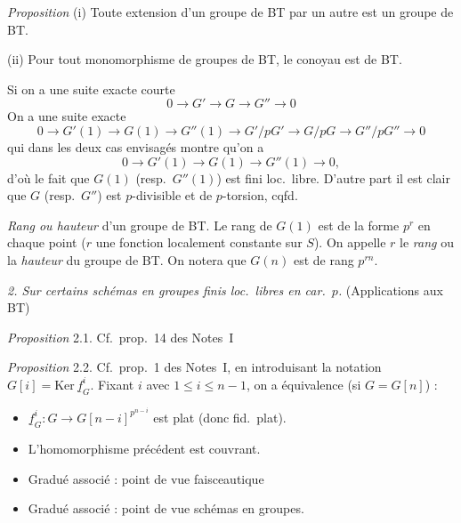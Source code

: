 \documentclass[11pt,a4paper]{article}
\begin{document}
\emph{Proposition} (i) Toute extension d'un groupe de BT par un autre est un groupe de BT.

(ii) Pour tout monomorphisme de groupes de BT, le conoyau est de BT.

 Si on a une suite exacte courte
\[
0 \to G' \to G \to G'' \to 0
\]
 On a une suite exacte
\[
0 \to G'(1) \to G(1) \to G''(1) \to G'/pG' \to G/pG \to G''/pG'' \to 0
\]
qui dans les deux cas envisagés montre qu'on a
\[
0 \to G'(1) \to G(1) \to G''(1) \to 0 ,
\]
d'où le fait que $G(1)$ (resp.\ $G''(1)$) est fini loc.\ libre. D'autre part il est clair que $G$ (resp.\ $G''$) est $p$-divisible et de $p$-torsion, cqfd.

\emph{Rang ou hauteur} d'un groupe de BT. Le rang de $G(1)$ est de la forme $p^r$ en chaque point ($r$ une fonction localement constante sur $S$). On appelle $r$ le \emph{rang} ou la \emph{hauteur} du groupe de BT. On notera que $G(n)$ est de rang $p^{rn}$.


\emph{2. Sur certains schémas en groupes finis loc.\ libres en car.\ $p$.} \quad (Applications aux BT)

\emph{Proposition} 2.1. Cf.\ prop.~14 des Notes~I

\emph{Proposition} 2.2. Cf.\ prop.~1 des Notes~I, en introduisant la notation $G[i] = \mathrm{Ker}\, \underline{f}^i_G$. Fixant $i$ avec $1 \leq i \leq n-1$, on a équivalence (si $G = G[n]$) :
\begin{itemize}
  \item[(i)] $\underline{f}^i_G : G \to G[n-i]^{p^{n-i}}$ est plat (donc fid.\ plat).
  \item[(i bis)] L'homomorphisme précédent est couvrant.
  \item[(ii)] Gradué associé : point de vue faisceautique
  \item[(ii bis)] Gradué associé : point de vue schémas en groupes.
\end{itemize}
\end{document}
